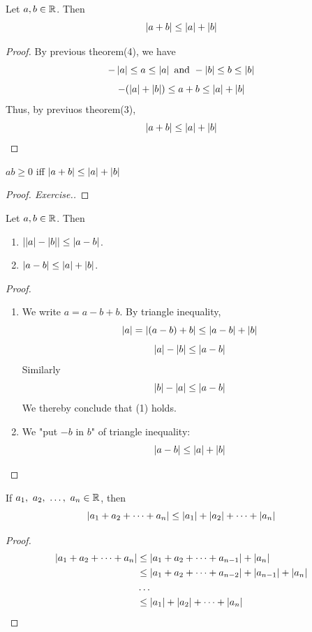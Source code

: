 \documentclass[a4paper,12pt]{article}
\begin{document}
\begin{theorem}
    Let \(a,b\in\R\). Then 
    \[\abs{a+b}\le \abs{a}+\abs{b}\]
    \begin{proof}
        By previous theorem(4), we have 
        \[-\abs{a}\le a\le \abs{a}\text{ and } -\abs{b}\le b\le \abs{b}\]
        \[-(\abs{a}+\abs{b})\le a+b\le \abs{a}+\abs{b}\]
        Thus, by previuos theorem(3),
        \[\abs{a+b}\le\abs{a}+\abs{b}\]
    \end{proof}
\end{theorem}

\begin{remark}
    \(ab\ge 0\) iff \(\abs{a+b}\le\abs{a}+\abs{b}\)
    \begin{proof}[Proof. Exercise.]
        
    \end{proof}
\end{remark}

\begin{corollary}
    Let \(a,b\in\R\). Then 
    \begin{enumerate}
        \item \(\abs{\abs{a}-\abs{b}}\le\abs{a-b}\).
        \item \(\abs{a-b}\le\abs{a}+\abs{b}\).
    \end{enumerate}
    \begin{proof}\ 
        \begin{enumerate}
            \item We write \(a=a-b+b\). By triangle inequality, 
            \[\abs{a}=\abs{(a-b)+b}\le\abs{a-b}+\abs{b}\]
            \[\abs{a}-\abs{b}\le\abs{a-b}\]
            Similarly \[\abs{b}-\abs{a}\le\abs{a-b}\]
            We thereby conclude that (1) holds.
            \item We "put \(-b\) in \(b\)" of triangle inequality:
            \[\abs{a-b}\le\abs{a}+\abs{b}\]
        \end{enumerate}
    \end{proof}
\end{corollary}

\begin{corollary}
    If \(a_1,\ a_2,\ \dots,\ a_n\in\R\), then 
    \[\abs{a_1+a_2+\dots+a_n}\le\abs{a_1}+\abs{a_2}+\dots+\abs{a_n}\]
    \begin{proof}
        \begin{align*}
            \abs{a_1+a_2+\dots+a_n}&\le\abs{a_1+a_2+\dots+a_{n-1}}+\abs{a_n}\\
            &\le \abs{a_1+a_2+\dots+a_{n-2}}+\abs{a_{n-1}}+\abs{a_n}\\
            & \dots\\
            &\le \abs{a_1}+\abs{a_2}+\dots+\abs{a_n}
        \end{align*}
    \end{proof}
\end{corollary}
\end{document}
